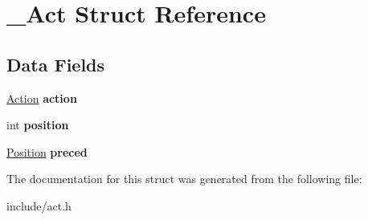 \hypertarget{struct___act}{\section{\-\_\-\-Act Struct Reference}
\label{struct___act}
}
\subsection*{Data Fields}
\begin{DoxyCompactItemize}
\item 
\hypertarget{struct___act_aa9cf7d0afedceb0d21dd5f412fe08c18}{\hyperlink{struct___action}{Action} {\bfseries action}}\label{struct___act_aa9cf7d0afedceb0d21dd5f412fe08c18}

\item 
\hypertarget{struct___act_a401e942526aac47cef94f478182486e7}{int {\bfseries position}}\label{struct___act_a401e942526aac47cef94f478182486e7}

\item 
\hypertarget{struct___act_a817ebe9ca292a4b41fb9321a5d8b47d3}{\hyperlink{struct___position}{Position} {\bfseries preced}}\label{struct___act_a817ebe9ca292a4b41fb9321a5d8b47d3}

\end{DoxyCompactItemize}


The documentation for this struct was generated from the following file\-:\begin{DoxyCompactItemize}
\item 
include/act.\-h\end{DoxyCompactItemize}
